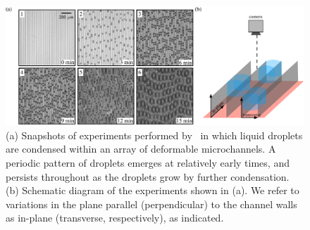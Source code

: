 \documentclass{jfm}
\begin{document}
\begin{figure}
    \centering
    \includegraphics[width = \textwidth]{figures/fig1_brinkmann_experiments.pdf}
    \caption{(a) Snapshots of experiments performed by~\cite{Seemann2011JPhysCondMat} in which liquid droplets are condensed within an array of deformable microchannels. A periodic pattern of droplets emerges at relatively early times, and persists throughout as the droplets grow by further condensation. (b) Schematic diagram of the experiments shown in (a). We refer to variations in the plane parallel (perpendicular) to the channel walls as in-plane (transverse, respectively), as indicated.}
    \label{fig:Experiments}
\end{figure}
\end{document}
